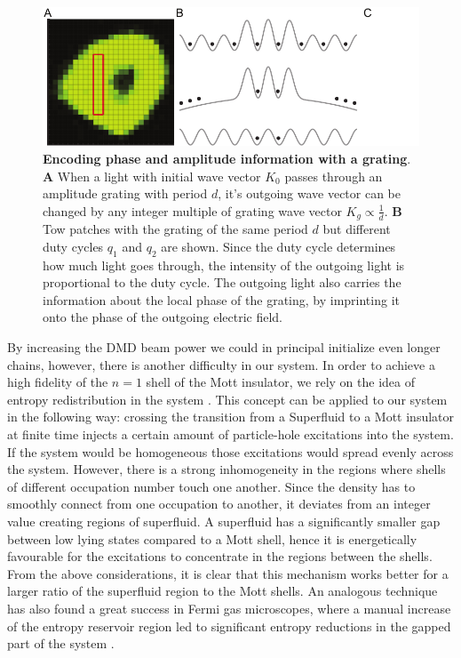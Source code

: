 \begin{figure}[t]
	\centering
	\includegraphics[scale=1]{figures/CTE_cutting.pdf}
	\caption{{\bf Encoding phase and amplitude information with a grating}. {\bf A} When a light with initial wave vector $K_0$ passes through an amplitude grating with period $d$, it's outgoing wave vector can be changed by any integer multiple of grating wave vector $K_g\propto \frac{1}{d}$. {\bf B} Tow patches with the grating of the same period $d$ but different duty cycles $q_1$ and $q_2$ are shown. Since the duty cycle determines how much light goes through, the intensity of the outgoing light is proportional to the duty cycle. The outgoing light also carries the information about the local phase of the grating, by imprinting it onto the phase of the outgoing electric field.}
	\label{fig:CTE_cutting}
\end{figure}

By increasing the DMD beam power we could in principal initialize even longer chains, however, there is another difficulty in our system. In order to achieve a high fidelity of the $n=1$ shell of the Mott insulator, we rely on the idea of entropy redistribution in the system \cite{some entropy redistribution}. This concept can be applied to our system in the following way: crossing the transition from a Superfluid to a Mott insulator at finite time injects a certain amount of particle-hole excitations into the system. If the system would be homogeneous those excitations would spread evenly across the system. However, there is a strong inhomogeneity in the regions where shells of different occupation number touch one another. Since the density has to smoothly connect from one occupation to another, it deviates from an integer value creating regions of superfluid. A superfluid has a significantly smaller gap between low lying states compared to a Mott shell, hence it is energetically favourable for the excitations to concentrate in the regions between the shells. From the above considerations, it is clear that this mechanism works better for a larger ratio of the superfluid region to the Mott shells. An analogous technique has also found a great success in Fermi gas microscopes, where a manual increase of the entropy reservoir region led to significant entropy reductions in the gapped part of the system \cite{Mazurenko2017, Chiu2018}.


